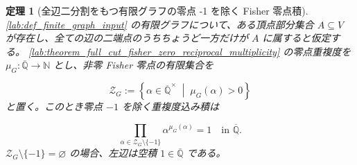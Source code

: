 \documentclass[11pt,a4paper]{article}
\newtheorem{theorem}[definition]{定理}
\theoremstyle{remark}
\begin{document}
\begin{theorem}[全辺二分割をもつ有限グラフの零点 -1 を除く Fisher 零点積]\label{lab:theorem_full_cut_fisher_zero_product_away_from_minus_one}
\cref{lab:def_finite_graph_input}
 の有限グラフについて、ある頂点部分集合 
$A\subseteq V$
 が存在し、全ての辺の二端点のうちちょうど一方だけが 
$A$
 に属すると仮定する。
\cref{lab:theorem_full_cut_fisher_zero_reciprocal_multiplicity}
 の零点重複度を 
$\mu_G:\overline{\mathbb Q}\to\mathbb N$
 とし、非零 Fisher 零点の有限集合を

\[\mathcal Z_G:=
\left\{
  \alpha\in\overline{\mathbb Q}^{\times}
  \;\middle|\;
  \mu_G(\alpha)>0
\right\}\]
と置く。このとき零点 
$-1$
 を除く重複度込み積は

\[\prod_{\alpha\in\mathcal Z_G\setminus\{-1\}}
\alpha^{\mu_G(\alpha)}=1
\quad\text{in }\overline{\mathbb Q}.\]
$\mathcal Z_G\setminus\{-1\}=\varnothing$
 の場合、左辺は空積 
$1\in\overline{\mathbb Q}$
 である。

\end{theorem}
\end{document}
